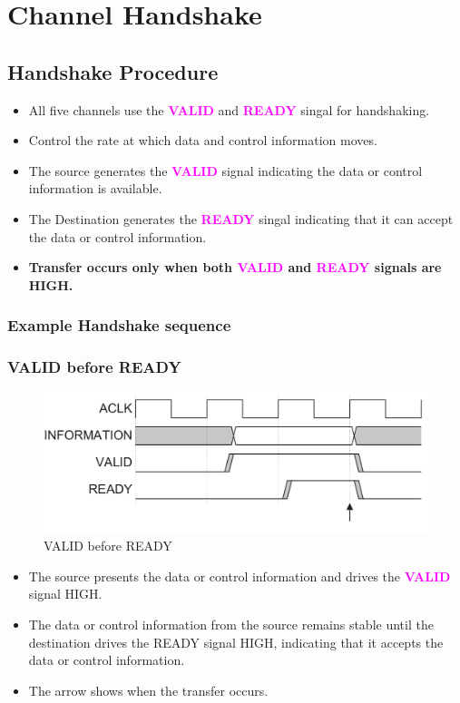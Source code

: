 \documentclass{article}
\newcommand{\AXISignals}[1]{\textbf{\textcolor{magenta}{#1}}}
\begin{document}
\section{Channel Handshake}
\subsection{Handshake Procedure}
\begin{itemize}
    \item All five channels use the \AXISignals{VALID} and \AXISignals{READY} singal for handshaking.
    \item Control the rate at which data and control information moves.
    \item The source generates the \AXISignals{VALID} signal indicating the data or control information is available.
    \item The Destination generates the \AXISignals{READY} singal indicating that it can accept the data or control information.
    \item \textbf{Transfer occurs only when both \AXISignals{VALID} and \AXISignals{READY} signals are HIGH.}
\end{itemize}

\subsubsection{Example Handshake sequence}
\subsubsection*{VALID before READY}
\begin{figure}[H]
    \centering
    \includegraphics[width=1\textwidth]{Resources/ValidBeforeReady.png}
    \caption{VALID before READY}
\end{figure}
\begin{itemize}
    \item The source presents the data or control information and drives the \AXISignals{VALID} signal HIGH.
    \item The data or control information from the source remains stable until the destination drives the READY signal HIGH, indicating that it accepts the data or control information.
    \item The arrow shows when the transfer occurs.
\end{itemize}
\end{document}
